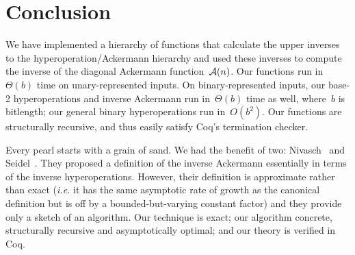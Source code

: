 
\section{Conclusion}
We have implemented a hierarchy of functions that calculate the upper inverses
to the hyperoperation/Ackermann hierarchy and used these inverses
to compute the inverse of the diagonal Ackermann function~$\mathcal{A}(n)$.
Our functions run in~$\Theta(b)$ time on unary-represented inputs.  On
binary-represented inputs, our \mbox{base-2} hyperoperations and inverse Ackermann
run in~$\Theta(b)$ time as well, where~$b$ is bitlength; our general binary 
hyperoperations run in~$O(b^2)$.
Our functions are structurally recursive,
and thus easily satisfy Coq's termination checker.

Every pearl starts with a grain of sand.  We had the benefit of two:
Nivasch~\cite{nivasch} and Seidel~\cite{seidel}.
They proposed a definition of the inverse Ackermann essentially in terms of
the inverse hyperoperations.  However, their definition is approximate rather than exact (\emph{i.e.} it has the same asymptotic rate of growth as the canonical definition but is off by a bounded-but-varying constant factor) and they provide only a sketch of an algorithm.  Our technique is exact; our algorithm concrete, structurally recursive and asymptotically optimal; and our theory is verified in Coq.








